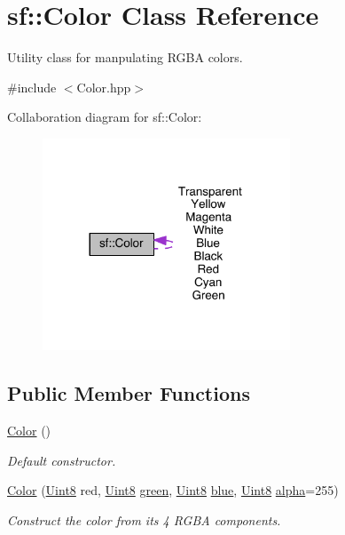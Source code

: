 \hypertarget{classsf_1_1_color}{\section{sf\-:\-:Color Class Reference}
\label{classsf_1_1_color}
}


Utility class for manpulating R\-G\-B\-A colors.  




{\ttfamily \#include $<$Color.\-hpp$>$}



Collaboration diagram for sf\-:\-:Color\-:
\nopagebreak
\begin{figure}[H]
\begin{center}
\leavevmode
\includegraphics[width=209pt]{classsf_1_1_color__coll__graph}
\end{center}
\end{figure}
\subsection*{Public Member Functions}
\begin{DoxyCompactItemize}
\item 
\hyperlink{classsf_1_1_color_ac2eb4393fb11ad3fa3ccf34e92fe08e4}{Color} ()
\begin{DoxyCompactList}\small\item\em Default constructor. \end{DoxyCompactList}\item 
\hyperlink{classsf_1_1_color_ac791dc61be4c60baac50fe700f1c9850}{Color} (\hyperlink{namespacesf_a4ef3d630785c4f296f9b4f274c33d78e}{Uint8} red, \hyperlink{namespacesf_a4ef3d630785c4f296f9b4f274c33d78e}{Uint8} \hyperlink{gl3_8h_aef30e4e3dccbffce99b7509d5366faef}{green}, \hyperlink{namespacesf_a4ef3d630785c4f296f9b4f274c33d78e}{Uint8} \hyperlink{gl3_8h_ab4fcc6ff520ae4d9de259c8468a5cd93}{blue}, \hyperlink{namespacesf_a4ef3d630785c4f296f9b4f274c33d78e}{Uint8} \hyperlink{gl3_8h_a090ebe65994a3ee4bb60ae3472abffc5}{alpha}=255)
\begin{DoxyCompactList}\small\item\em Construct the color from its 4 R\-G\-B\-A components. \end{DoxyCompactList}\end{DoxyCompactItemize}
